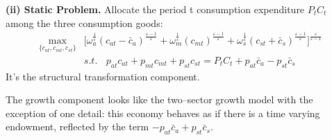 \documentclass{article}
\begin{document}
    \textbf{(ii) Static Problem.} Allocate the period t consumption expenditure $P_tC_t$ among the three consumption goods:
    \begin{align*}
        \max_{\{ c_{at},c_{mt},c_{st} \}}& [ \omega_a^{\frac{1}{\varepsilon}} (c_{at}-\bar{c}_a)^\frac{\varepsilon-1}{\varepsilon} + \omega_m^{\frac{1}{\varepsilon}} (c_{mt})^\frac{\varepsilon-1}{\varepsilon} + \omega_s^{\frac{1}{\varepsilon}} (c_{st}+\bar{c}_s)^\frac{\varepsilon-1}{\varepsilon} \biggr]^{\frac{\varepsilon}{\varepsilon-1}}\\
        &s.t.\ \ \ \ p_{at}c_{at}+p_{mt}c_{mt}+p_{st}c_{st}=P_tC_t+p_{at}\bar{c}_a-p_{st}\bar{c}_s
    \end{align*}
    It's the structural transformation component.

    The growth component looks like the two–sector growth model with the exception of one detail: this economy behaves as if there is a time varying endowment, reflected by the term $−p_{at}\bar{c}_a + p_{st}\bar{c}_s$.
\end{document}
